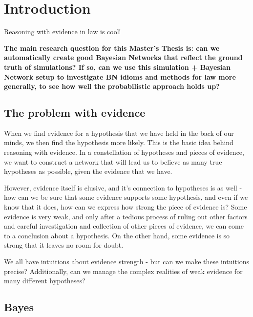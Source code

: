  

\chapter[Introduction]{Introduction}

Reasoning with evidence in law is cool!




\textbf{The main research question for this Master's Thesis is: can we automatically create good Bayesian Networks that reflect the ground truth of simulations? If so, can we use this simulation + Bayesian Network setup to investigate BN idioms and methods for law more generally, to see how well the probabilistic approach holds up?}



\section{The problem with evidence}

When we find evidence for a hypothesis that we have held in the back of our minds, we then find the hypothesis more likely. 
This is the basic idea behind reasoning with evidence. In a constellation of hypotheses and pieces of evidence, we want
to construct a network that will lead us to believe as many true hypotheses as possible, given the evidence that we have.

However, evidence itself is elusive, and it's connection to hypotheses is as well - how can we be sure that some evidence supports
some hypothesis, and even if we know that it does, how can we express how strong the piece of evidence is? Some evidence
is very weak, and only after a tedious process of ruling out other factors and careful investigation and collection of other pieces
of evidence, we can come to a conclusion about a hypothesis. On the other hand, some evidence is so strong that it leaves no room for doubt.

We all have intuitions about evidence strength - but can we make these intuitions precise? Additionally, can we manage the complex
realities of weak evidence for many different hypotheses? 

\section{Bayes}

